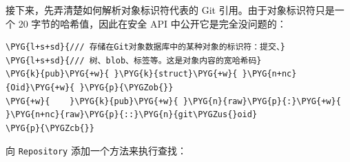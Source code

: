接下来，先弄清楚如何解析对象标识符代表的 Git 引用。由于对象标识符只是一个 20 字节的哈希值，因此在安全 API 中公开它是完全没问题的：

\begin{Verbatim}[commandchars=\\\{\},breaklines=true,breakanywhere=true,fontsize=\codefont,xleftmargin=17bp]
\PYG{l+s+sd}{/// 存储在Git对象数据库中的某种对象的标识符：提交、}
\PYG{l+s+sd}{/// 树、blob、标签等。这是对象内容的宽哈希码}
\PYG{k}{pub}\PYG{+w}{ }\PYG{k}{struct}\PYG{+w}{ }\PYG{n+nc}{Oid}\PYG{+w}{ }\PYG{p}{\PYGZob{}}
\PYG{+w}{    }\PYG{k}{pub}\PYG{+w}{ }\PYG{n}{raw}\PYG{p}{:}\PYG{+w}{ }\PYG{n+nc}{raw}\PYG{p}{::}\PYG{n}{git\PYGZus{}oid}
\PYG{p}{\PYGZcb{}}
\end{Verbatim}

向 \texttt{Repository} 添加一个方法来执行查找：

